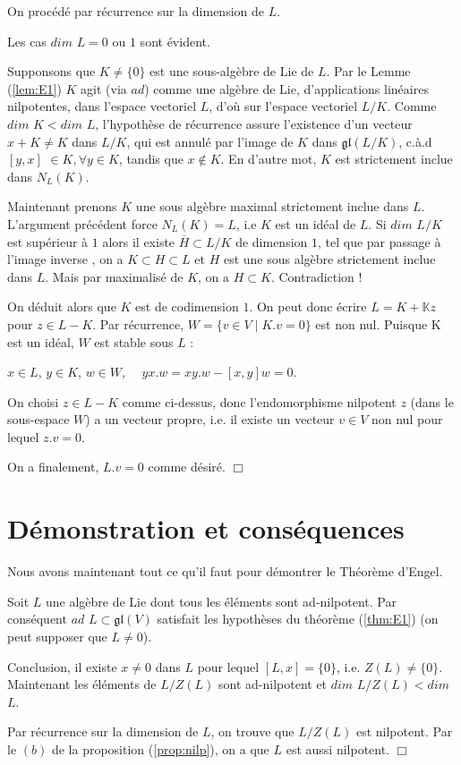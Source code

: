 \documentclass[a4paper,openany,12pt]{report}
\newcommand{\KK}{\mathbb{K}}
\newcommand{\gl}{\mathfrak{gl}}
\theoremstyle{break}
{\theorembodyfont{\upshape}
\newtheorem*{rmq}{Remarque :}
\newtheorem*{prv}{Preuve :}
\newtheorem*{ex}{Exemples :}
\newtheorem*{exe}{Exemple : }
\newtheorem*{nota}{Notation :}
\newtheorem*{dem}{D\'emonstration :}}
\begin{document}
\begin{dem}
\quad On procédé par récurrence sur la dimension de $L$.

Les cas $dim$ $L = 0$ ou $1$ sont évident.

Supponsons que $K \neq \{0\}$ est une sous-algèbre de Lie de $L$. Par le Lemme (\ref{lem:E1}) $K$ agit (via $ad$) comme une algèbre de Lie, d'applications linéaires nilpotentes, dans l'espace vectoriel $L$, d'où sur l'espace vectoriel $L/K$. Comme $dim$ $K < dim$ $L$, l'hypothèse de récurrence assure l’existence d'un vecteur $x + K \neq K $ dans $L/K$, qui est annulé par l'image de $K$ dans $\gl(L/K)$, c.à.d $[y,x]$ $\in K, \forall y \in K$, tandis que $x \notin K$. En d'autre mot, $K$ est strictement inclue dans $N_{L}(K)$.

Maintenant prenons $K$ une sous algèbre maximal strictement inclue dans $L$. L'argument précédent force $N_{L}(K) = L$, i.e $K$ est un idéal de $L$. Si $dim$ $L/K$ est supérieur à $1$ alors il existe $\overline{H} \subset L/K$ de dimension $1$, tel que par passage à l'image inverse , on a $K \subset H \subset L$ et $H$ est une sous algèbre strictement inclue dans $L$. Mais par maximalisé de $K$, on a $H \subset K$. Contradiction !

On déduit alors que $K$ est de codimension $1$. On peut donc écrire $L=K+ \KK z$ pour $z \in L-K$.
Par récurrence, $W = \{ v \in V \mid K.v = 0\}$ est non nul. Puisque K est un idéal, $W$ est stable sous $L$ : 
\begin{center}
$x \in L$, $y \in K$, $w \in W$, $\quad yx.w = xy.w - [x,y]w =0$.
\end{center}
\quad On choisi $z \in L-K$ comme ci-dessus, donc l'endomorphisme nilpotent $z$ (dans le sous-espace $W$) a un vecteur propre, i.e. il existe un vecteur $v \in V$ non nul pour lequel $z.v = 0$.

On a finalement, $L.v = 0$ comme désiré. $\Box$
\end{dem}

\section{Démonstration et conséquences}

Nous avons maintenant tout ce qu'il faut pour démontrer le Théorème d'Engel.

\begin{dem}
\quad Soit $L$ une algèbre de Lie dont tous les éléments sont ad-nilpotent. Par conséquent $ad$ $L \subset \gl(V)$  satisfait les hypothèses du théorème (\ref{thm:E1}) (on peut supposer que $L \neq 0$).

Conclusion, il existe $x \neq 0$ dans $L$ pour lequel $[L,x]=\{0\}$, i.e. $Z(L) \neq \{0\}$. Maintenant les éléments de $L/Z(L)$ sont ad-nilpotent et $dim$ $L/Z(L) < dim$ $L$.

Par récurrence sur la dimension de $L$, on  trouve que $L/Z(L)$ est nilpotent. Par le $(b)$ de la proposition (\ref{prop:nilp}), on a que $L$ est aussi nilpotent. $\Box$
\end{dem}
\end{document}
